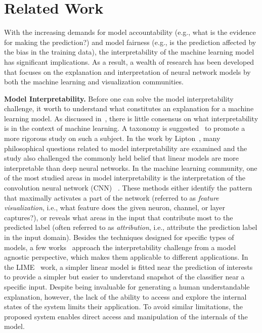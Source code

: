 
\section{Related Work}
With the increasing demands for model accountability (e.g., what is the evidence for making the prediction?) and model fairness (e.g., is the prediction affected by the bias in the training data),
the interpretability of the machine learning model has significant implications. As a result, a wealth of research has been developed that focuses on the explanation and interpretation of neural network models by both the machine learning and visualization communities.

\textbf{Model Interpretability.}
Before one can solve the model interpretability challenge, it worth to understand what constitutes an explanation for a machine learning model.
As discussed in~\cite{Lipton2016, Doshi-Velez2017}, there is little consensus on what interpretability is in the context of machine learning. A taxonomy is suggested~\cite{Doshi-Velez2017} to promote a more rigorous study on such a subject. In the work by Lipton~\cite{Lipton2016}, many philosophical questions related to model interpretability are examined and the study also challenged the commonly held belief that linear models are more interpretable than deep neural networks.
%
In the machine learning community, one of the most studied areas in model interpretability is the interpretation of the convolution neural network (CNN) ~\cite{SimonyanVedaldiZisserman2013, ZeilerFergus2014, YosinskiCluneNguyen2015, OlahMordvintsevSchubert2017, OlahSatyanarayanJohnson2018}.
%
These methods either identify the pattern that maximally activates a part of the network (referred to as \emph{feature visualization}, i.e., what feature does the given neuron, channel, or layer captures?), or reveals what areas in the input that contribute most to the predicted label (often referred to as \emph{attribution}, i.e., attribute the prediction label in the input domain).
%
Besides the techniques designed for specific types of models, a few works~\cite{RibeiroSinghGuestrin2016, KrausePererNg2016, LundbergLee2017} approach the interpretability challenge from a model agnostic perspective, which makes them applicable to different applications. In the LIME~\cite{RibeiroSinghGuestrin2016} work, a simpler linear model is fitted near the prediction of interests to provide a simpler but easier to understand snapshot of the classifier near a specific input.
%
Despite being invaluable for generating a human understandable explanation, however, the lack of the ability to access and explore the internal states of the system limits their application. 
To avoid similar limitations, the proposed system enables direct access and manipulation of the internals of the model.

